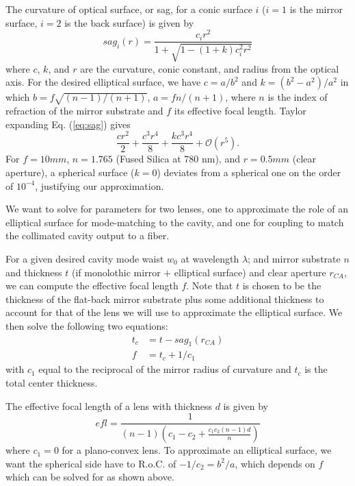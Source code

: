 The curvature of optical surface, or sag, for a conic surface $i$ ($i=1$ is the mirror surface, $i=2$ is the back surface) is given by 
\begin{equation}\label{eq:sag}
    sag_i(r) = \frac{c_i r^2}{1+\sqrt{1 - (1+k) c_i^2 r^2}} 
\end{equation}
where $c$, $k$, and $r$ are the curvature, conic constant, and radius from the optical axis. For the desired elliptical surface, we have $c=a/b^2$ and $k=(b^2-a^2)/a^2$ in which $b=f \sqrt{(n-1)/(n+1)}$, $a = f n/(n+1)$, where $n$ is the index of refraction of the mirror substrate and $f$ its effective focal length. Taylor expanding Eq. (\ref{eq:sag}) gives
\begin{equation}
    \frac{c r^2}{2} + \frac{c^3 r^4}{8} + \frac{k c^3 r^4}{8} + \mathcal{O}(r^5).
\end{equation}
For $f=10 mm$, $n=1.765$ (Fused Silica at 780 nm), and $r=0.5 mm$ (clear aperture), a spherical surface ($k=0$) deviates from a spherical one on the order of $10^{-4}$, justifying our approximation.

We want to solve for parameters for two lenses, one to approximate the role of an elliptical surface for mode-matching to the cavity, and one for coupling to match the collimated cavity output to a fiber.

For a given desired cavity mode waist $w_0$ at wavelength $\lambda$; and mirror substrate $n$ and thickness $t$ (if monolothic mirror $+$ elliptical surface) and clear aperture $r_{CA}$,  we can compute the effective focal length $f$. Note that $t$ is chosen to be the thickness of the flat-back mirror substrate plus some additional thickness to account for that of the lens we will use to approximate the elliptical surface. We then solve the following two equations:
\begin{align} 
    t_c &= t - sag_1(r_{CA}) \\ 
    f &= t_c + 1/c_1  
\end{align}
with $c_1$ equal to the reciprocal of the mirror radius of curvature and $t_c$ is the total center thickness.

The effective focal length of a lens with thickness $d$ is given by
\begin{equation}
    efl = \frac{1}{(n-1)(c_1 - c_2 + \frac{c_1 c_2 (n-1)d}{n})}
\end{equation}
where $c_1=0$ for a plano-convex lens. To approximate an elliptical surface, we want the spherical side have to R.o.C. of $ -1/c_2 = b^2/a$, which depends on $f$ which can be solved for as shown above.


